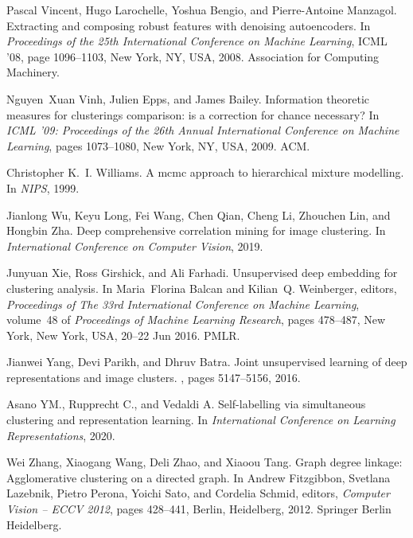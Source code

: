\documentclass[journal]{IEEEtran}
\begin{document}
{\begin{thebibliography}{10}
Pascal Vincent, Hugo Larochelle, Yoshua Bengio, and Pierre-Antoine Manzagol.
\newblock Extracting and composing robust features with denoising autoencoders.
\newblock In {\em Proceedings of the 25th International Conference on Machine
  Learning}, ICML '08, page 1096–1103, New York, NY, USA, 2008. Association
  for Computing Machinery.

Nguyen~Xuan Vinh, Julien Epps, and James Bailey.
\newblock Information theoretic measures for clusterings comparison: is a
  correction for chance necessary?
\newblock In {\em ICML '09: Proceedings of the 26th Annual International
  Conference on Machine Learning}, pages 1073--1080, New York, NY, USA, 2009.
  ACM.

Christopher K.~I. Williams.
\newblock A mcmc approach to hierarchical mixture modelling.
\newblock In {\em NIPS}, 1999.

Jianlong Wu, Keyu Long, Fei Wang, Chen Qian, Cheng Li, Zhouchen Lin, and
  Hongbin Zha.
\newblock Deep comprehensive correlation mining for image clustering.
\newblock In {\em International Conference on Computer Vision}, 2019.

Junyuan Xie, Ross Girshick, and Ali Farhadi.
\newblock Unsupervised deep embedding for clustering analysis.
\newblock In Maria~Florina Balcan and Kilian~Q. Weinberger, editors, {\em
  Proceedings of The 33rd International Conference on Machine Learning},
  volume~48 of {\em Proceedings of Machine Learning Research}, pages 478--487,
  New York, New York, USA, 20--22 Jun 2016. PMLR.

Jianwei Yang, Devi Parikh, and Dhruv Batra.
\newblock Joint unsupervised learning of deep representations and image
  clusters.
, pages 5147--5156, 2016.

Asano YM., Rupprecht C., and Vedaldi A.
\newblock Self-labelling via simultaneous clustering and representation
  learning.
\newblock In {\em International Conference on Learning Representations}, 2020.

Wei Zhang, Xiaogang Wang, Deli Zhao, and Xiaoou Tang.
\newblock Graph degree linkage: Agglomerative clustering on a directed graph.
\newblock In Andrew Fitzgibbon, Svetlana Lazebnik, Pietro Perona, Yoichi Sato,
  and Cordelia Schmid, editors, {\em Computer Vision -- ECCV 2012}, pages
  428--441, Berlin, Heidelberg, 2012. Springer Berlin Heidelberg.


\end{thebibliography}}
\end{document}
